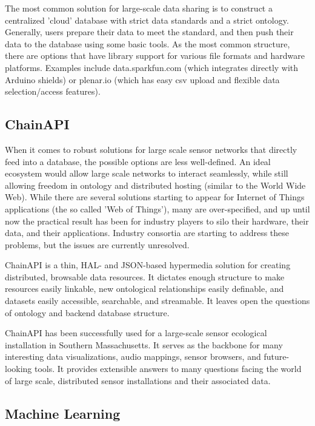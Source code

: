 The most common solution for large-scale data sharing is to construct a centralized 'cloud' database with strict data standards and a strict ontology.  Generally, users prepare their data to meet the standard, and then push their data to the database using some basic tools.  As the most common structure, there are options that have library support for various file formats and hardware platforms.  Examples include data.sparkfun.com (which integrates directly with Arduino shields) or plenar.io (which has easy csv upload and flexible data selection/access features).  

\subsection{ChainAPI}

When it comes to robust solutions for large scale sensor networks that directly feed into a database, the possible options are less well-defined.  An ideal ecosystem would allow large scale networks to interact seamlessly, while still allowing freedom in ontology and distributed hosting (similar to the World Wide Web).  While there are several solutions starting to appear for Internet of Things applications (the so called 'Web of Things'), many are over-specified, and up until now the practical result has been for industry players to silo their hardware, their data, and their applications.  Industry consortia are starting to address these problems,  but the issues are currently unresolved.

ChainAPI \cite{chainGit, chainPaper} is a thin, HAL- and JSON-based hypermedia solution for creating distributed, browsable data resources.  It dictates enough structure to make resources easily linkable, new ontological relationships easily definable, and datasets easily accessible, searchable, and streamable.  It leaves open the questions of ontology and backend database structure.

ChainAPI has been successfully used for a large-scale sensor ecological installation in Southern Massachusetts. \cite{ tidmarsh}  It serves as the backbone for many interesting data visualizations, audio mappings, sensor browsers, and future-looking tools.  It provides extensible answers to many questions facing the world of large scale, distributed sensor installations and their associated data.

\subsection{Machine Learning}

